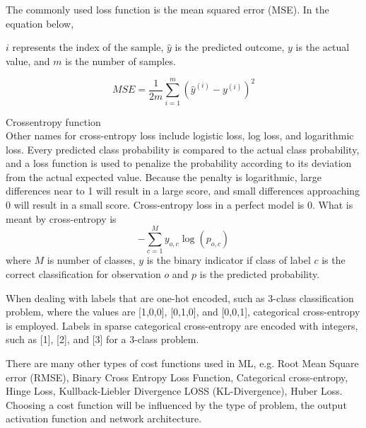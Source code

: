   
 The commonly used loss function is the mean squared error (MSE).  In the equation below,

$i$ represents the index of the sample,
$\hat{y}$ is the predicted outcome,
$y$ is the actual value, and
$m$ is the number of samples.

\begin{equation}
 MSE = \frac{1}{2m} \sum_{i=1}^{m} (\hat{y}^{(i)} - y^{(i)})^2
\end{equation}


Crossentropy function\\
Other names for cross-entropy loss include logistic loss, log loss, and logarithmic loss. Every predicted class probability is compared to the actual class probability, and a loss function is used to penalize the probability according to its deviation from the actual expected value. Because the penalty is logarithmic, large differences near to 1 will result in a large score, and small differences approaching 0 will result in a small score. Cross-entropy loss in a perfect model is 0.
What is meant by cross-entropy is 
\begin{equation}
		-\sum_{c=1}^My_{o,c}\log(p_{o,c})
\end{equation}
where $M$ is number of classes, $y$ is the binary indicator if class of label $c$ is the correct classification for observation $o$ and $p$ is the predicted probability.

When dealing with labels that are one-hot encoded, such as 3-class classification problem, where the values are [1,0,0], [0,1,0], and [0,0,1], categorical cross-entropy is employed.
Labels in sparse categorical cross-entropy are encoded with integers, such as [1], [2], and [3] for a 3-class problem.


There are many other types of cost functions used in ML, e.g. Root Mean Square error (RMSE), Binary Cross Entropy Loss Function,  Categorical cross-entropy, Hinge Loss, Kullback-Liebler Divergence LOSS (KL-Divergence), Huber Loss. Choosing a cost function will be influenced by the type of problem, the output activation function and network architecture.



